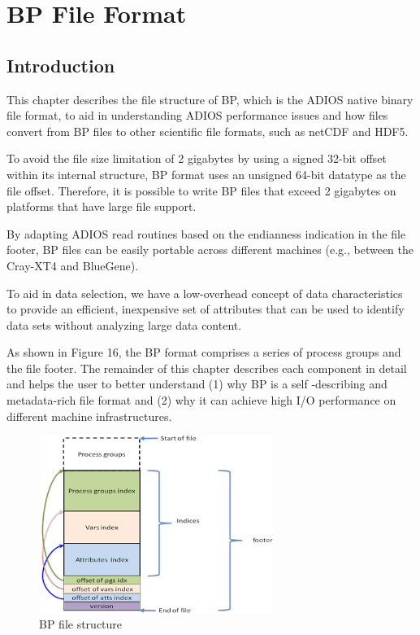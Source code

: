 \chapter{BP File Format}

\section{Introduction}

This chapter describes the file structure of BP, which is the ADIOS native binary 
file format, to aid in understanding ADIOS performance issues and how files convert 
from BP files to other scientific file formats, such as netCDF and HDF5.

To avoid the file size limitation of 2 gigabytes by using a signed 32-bit offset 
within its internal structure, BP format uses an unsigned 64-bit datatype as the 
file offset. Therefore, it is possible to write BP files that exceed 2 gigabytes 
on platforms that have large file support. 

By adapting ADIOS read routines based on the endianness indication in the file 
footer, BP files can be easily portable across different machines (e.g., between 
the Cray-XT4 and BlueGene). 

To aid in data selection, we have a low-overhead concept of data characteristics 
to provide an efficient, inexpensive set of attributes that can be used to identify 
data sets without analyzing large data content.

As shown in Figure 16, the BP format comprises a series of process groups and the 
file footer. The remainder of this chapter describes each component in detail and 
helps the user to better understand (1) why BP is a self -describing and metadata-rich 
file format and (2) why it can achieve high I/O performance on different machine 
infrastructures. 

\begin{figure}[htbp]
\begin{center}
\includegraphics[width=217pt, height=163pt]{ADIOS-Manual-fig029.png}
\caption{BP file structure}
\end{center}
\end{figure}\label{HRef119578739}\label{HToc144350175}

